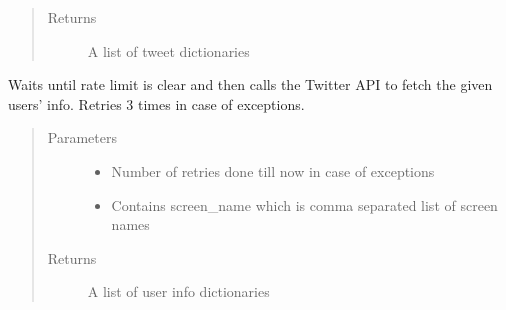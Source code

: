 \documentclass[letterpaper,10pt,english]{sphinxmanual}
\begin{document}
\begin{fulllineitems}
\begin{fulllineitems}
\begin{quote}
\begin{description}
\begin{itemize}
\end{itemize}

\item[{Returns}] \leavevmode
A list of tweet dictionaries

\end{description}\end{quote}

\end{fulllineitems}


\begin{fulllineitems}
\label{\detokenize{twitter_stream:userstimeline.UserTimelineAPI.my_user_fetcher}}
Waits until rate limit is clear and then calls the Twitter API to fetch the given users’ info.
Retries 3 times in case of exceptions.
\begin{quote}\begin{description}
\item[{Parameters}] \leavevmode\begin{itemize}
\item {} 
 \textendash{} Number of retries done till now in case of exceptions

\item {} 
 \textendash{} Contains screen\_name which is comma separated list of screen names

\end{itemize}

\item[{Returns}] \leavevmode
A list of user info dictionaries

\end{description}\end{quote}

\end{fulllineitems}



\end{fulllineitems}
\end{document}
